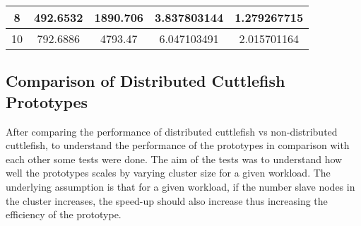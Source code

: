 \begin{table}[]
\begin{tabular}{|c|c|c|c|c|}
8                                                                                                                            & 492.6532                                                                                                                                              & 1890.706                                                                                                              & 3.837803144       & 1.279267715                 \\ \hline
10                                                                                                                           & 792.6886                                                                                                                                              & 4793.47                                                                                                               & 6.047103491       & 2.015701164                 \\ \hline
\end{tabular}
\end{table}



\subsection{Comparison of Distributed Cuttlefish Prototypes} \label{ProtoComp}

After comparing the performance of distributed cuttlefish vs non-distributed cuttlefish, to understand the performance of the prototypes in comparison with each other some tests were done. The aim of the tests was to understand how well the prototypes scales by varying cluster size for a given workload. The underlying assumption is that for a given workload, if the number slave nodes in the cluster increases, the speed-up should also increase thus increasing the efficiency of the prototype. 


